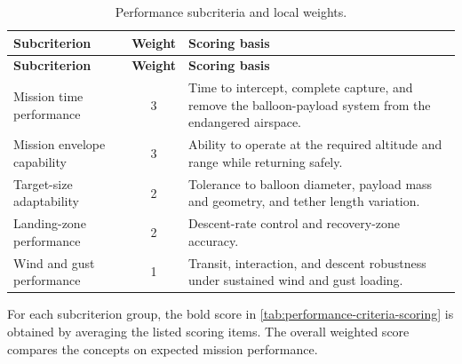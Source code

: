 {
\small
\setlength{\LTleft}{0pt}
\setlength{\LTright}{0pt}

\begin{longtable}{@{}p{}c p{}@{}}
\caption{Performance subcriteria and local weights.}
\label{tab:performance_subcriteria_weights} \\
\toprule
\textbf{Subcriterion} & \textbf{Weight} & \textbf{Scoring basis} \\
\midrule
\endfirsthead

\toprule
\textbf{Subcriterion} & \textbf{Weight} & \textbf{Scoring basis} \\
\midrule
\endhead

\bottomrule
\endfoot

Mission time performance & 3 & Time to intercept, complete capture, and remove the balloon-payload system from the endangered airspace. \\
Mission envelope capability & 3 & Ability to operate at the required altitude and range while returning safely. \\
Target-size adaptability & 2 & Tolerance to balloon diameter, payload mass and geometry, and tether length variation. \\
Landing-zone performance & 2 & Descent-rate control and recovery-zone accuracy. \\
Wind and gust performance & 1 & Transit, interaction, and descent robustness under sustained wind and gust loading. \\

\bottomrule
\end{longtable}
}

For each subcriterion group, the bold score in
\autoref{tab:performance-criteria-scoring} is obtained by averaging the
listed scoring items. The overall weighted score compares the concepts
on expected mission performance.


